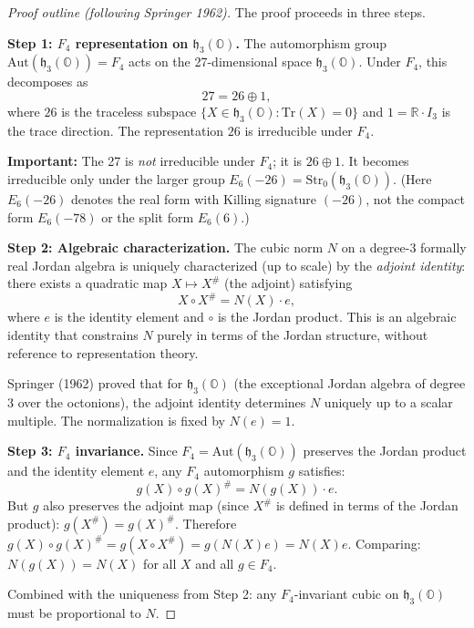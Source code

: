 \documentclass[11pt]{article}
\begin{document}
\begin{proof}[Proof outline (following Springer 1962)]
The proof proceeds in three steps.

\textbf{Step 1: $F_4$ representation on $\mathfrak{h}_3(\mathbb{O})$.}
The automorphism group $\mathrm{Aut}(\mathfrak{h}_3(\mathbb{O})) = F_4$ acts on the
27-dimensional space $\mathfrak{h}_3(\mathbb{O})$. Under $F_4$, this decomposes as
\[
27 = 26 \oplus 1,
\]
where $26$ is the traceless subspace $\{X \in \mathfrak{h}_3(\mathbb{O}) : \mathrm{Tr}(X) = 0\}$
and $1 = \mathbb{R} \cdot I_3$ is the trace direction. The representation $26$ is
irreducible under $F_4$.

\textbf{Important:} The 27 is \emph{not} irreducible under $F_4$; it is $26 \oplus 1$.
It becomes irreducible only under the larger group $E_6(-26) = \mathrm{Str}_0(\mathfrak{h}_3(\mathbb{O}))$.
(Here $E_6(-26)$ denotes the real form with Killing signature $(-26)$, not the compact
form $E_6(-78)$ or the split form $E_6(6)$.)

\textbf{Step 2: Algebraic characterization.}
The cubic norm $N$ on a degree-3 formally real Jordan algebra is uniquely characterized
(up to scale) by the \emph{adjoint identity}: there exists a quadratic map
$X \mapsto X^\#$ (the adjoint) satisfying
\[
X \circ X^\# = N(X) \cdot e,
\]
where $e$ is the identity element and $\circ$ is the Jordan product. This is an
algebraic identity that constrains $N$ purely in terms of the Jordan structure,
without reference to representation theory.

Springer (1962) proved that for $\mathfrak{h}_3(\mathbb{O})$ (the exceptional Jordan algebra
of degree 3 over the octonions), the adjoint identity determines $N$ uniquely up to
a scalar multiple. The normalization is fixed by $N(e) = 1$.

\textbf{Step 3: $F_4$ invariance.}
Since $F_4 = \mathrm{Aut}(\mathfrak{h}_3(\mathbb{O}))$ preserves the Jordan product and
the identity element $e$, any $F_4$ automorphism $g$ satisfies:
\[
g(X) \circ g(X)^\# = N(g(X)) \cdot e.
\]
But $g$ also preserves the adjoint map (since $X^\#$ is defined in terms of the Jordan
product): $g(X^\#) = g(X)^\#$. Therefore $g(X) \circ g(X)^\# = g(X \circ X^\#) = g(N(X) e)
= N(X) e$. Comparing: $N(g(X)) = N(X)$ for all $X$ and all $g \in F_4$.

Combined with the uniqueness from Step 2: any $F_4$-invariant cubic on
$\mathfrak{h}_3(\mathbb{O})$ must be proportional to $N$.


\end{proof}
\end{document}
